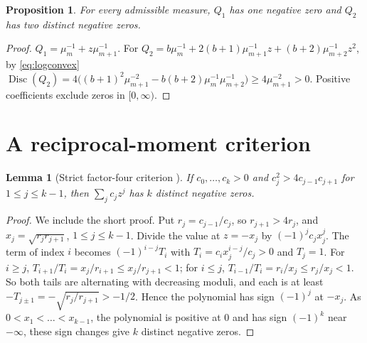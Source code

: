 \documentclass[11pt,a4paper]{article}
\newtheorem{proposition}[theorem]{Proposition}
\newtheorem{lemma}[theorem]{Lemma}
\theoremstyle{definition}
\theoremstyle{remark}
\newcommand{\Disc}{\operatorname{Disc}}
\begin{document}
\begin{proposition}\label{prop:low}
For every admissible measure, $Q_1$ has one negative zero and $Q_2$ has two
distinct negative zeros.
\end{proposition}
\begin{proof}
$Q_1=\mu_m^{-1}+z\mu_{m+1}^{-1}$. For $Q_2=b\mu_m^{-1}+2(b+1)\mu_{m+1}^{-1}z
+(b+2)\mu_{m+2}^{-1}z^2$, by \eqref{eq:logconvex}
$\Disc(Q_2)=4\bigl((b+1)^2\mu_{m+1}^{-2}-b(b+2)\mu_m^{-1}\mu_{m+2}^{-1}\bigr)
\ge4\mu_{m+1}^{-2}>0$. Positive coefficients exclude zeros in $[0,\infty)$.
\end{proof}

\section{A reciprocal-moment criterion}\label{sec:criterion}

\begin{lemma}[Strict factor-four criterion \cite{Hutchinson1923,Kurtz1992}]\label{lem:four}
If $c_0,\dots,c_k>0$ and $c_j^2>4c_{j-1}c_{j+1}$ for $1\le j\le k-1$, then
$\sum_jc_jz^j$ has $k$ distinct negative zeros.
\end{lemma}
\begin{proof}
We include the short proof. Put $r_j=c_{j-1}/c_j$, so $r_{j+1}>4r_j$, and
$x_j=\sqrt{r_jr_{j+1}}$, $1\le j\le k-1$. Divide the value at $z=-x_j$ by
$(-1)^jc_jx_j^j$. The term of index $i$ becomes $(-1)^{i-j}T_i$ with
$T_i=c_ix_j^{i-j}/c_j>0$ and $T_j=1$. For $i\ge j$,
$T_{i+1}/T_i=x_j/r_{i+1}\le x_j/r_{j+1}<1$; for $i\le j$,
$T_{i-1}/T_i=r_i/x_j\le r_j/x_j<1$. So both tails are alternating with
decreasing moduli, and each is at least $-T_{j\pm1}=-\sqrt{r_j/r_{j+1}}>-1/2$.
Hence the polynomial has sign $(-1)^j$ at $-x_j$. As
$0<x_1<\dots<x_{k-1}$, the polynomial is positive at $0$ and has sign
$(-1)^k$ near $-\infty$, these sign changes give $k$ distinct negative zeros.
\end{proof}
\end{document}
